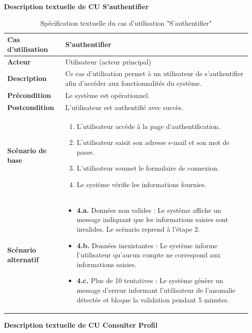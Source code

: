 \documentclass[a4paper,11pt]{report}
\begin{document}
\newpage
\textbf{Description textuelle de CU S'authentifier}

\begin{table}[H]
  \centering
  \renewcommand{\arraystretch}{1.5}
  \caption{Spécification textuelle du cas d'utilisation "S'authentifier"}
  \begin{tabularx}{\textwidth}{|l|X|}
    \hline
    \textbf{Cas d'utilisation} & S'authentifier \\ \hline
    \textbf{Acteur} & Utilisateur (acteur principal) \\ \hline
    \textbf{Description} & Ce cas d’utilisation permet à un utilisateur de s’authentifier afin d’accéder aux fonctionnalités du système. \\ \hline
    \textbf{Précondition} & Le système est opérationnel. \\ \hline
    \textbf{Postcondition} & L’utilisateur est authentifié avec succès. \\ \hline
    \textbf{Scénario de base} &
    \begin{enumerate}[leftmargin=*]
      \item L’utilisateur accède à la page d’authentification.
      \item L’utilisateur saisit son adresse e-mail et son mot de passe.
      \item L’utilisateur soumet le formulaire de connexion.
      \item Le système vérifie les informations fournies.
    \end{enumerate} \\ \hline
    \textbf{Scénario alternatif} &
    \begin{itemize}[leftmargin=*]
      \item \textbf{4.a.} Données non valides : Le système affiche un message indiquant que les informations saisies sont invalides. Le scénario reprend à l'étape 2.
      \item \textbf{4.b.} Données inexistantes : Le système informe l’utilisateur qu’aucun compte ne correspond aux informations saisies.
      \item \textbf{4.c.} Plus de 10 tentatives : Le système génère un message d’erreur informant l’utilisateur de l’anomalie détectée et bloque la validation pendant 5 minutes.
    \end{itemize} \\ \hline
  \end{tabularx}
\end{table}

\begingroup
\small
\renewcommand{\arraystretch}{1.2}
\textbf{Description textuelle de CU Consulter Profil}
\end{document}
